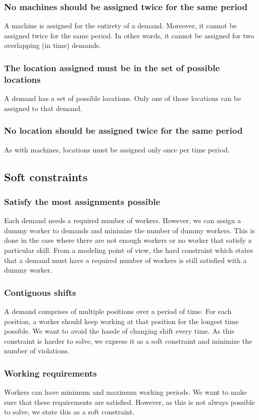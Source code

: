 \documentclass[../thesis.tex]{subfiles}
\begin{document}
\subsubsection{No machines should be assigned twice for the same period}

A machine is assigned for the entirety of a demand. Moreover, it cannot be assigned twice 
for the same period. In other words, it cannot be assigned for two overlapping (in time) demands.


\subsubsection{The location assigned must be in the set of possible locations}

A demand has a set of possible locations. Only one of those locations can be assigned 
to that demand.

\subsubsection{No location should be assigned twice for the same period}

As with machines, locations must be assigned only once per time period.


\subsection{Soft constraints}

\subsubsection{Satisfy the most assignments possible}

Each demand needs a required number of workers. However, we can assign a dummy worker to demands 
and minimize the number of dummy workers. This is done in the case where there are not enough workers
or no worker that satisfy a particular skill. From a modeling point of view, the hard constraint which states that 
a demand must have a required number of workers is still satisfied with a dummy worker.

\subsubsection{Contiguous shifts}

A demand comprises of multiple positions over a period of time. 
For each position, a worker should keep working at that position for the longest time possible. 
We want to avoid the hassle of changing shift every time. 
As this constraint is harder to solve, we express it as a soft constraint and minimize the number of 
violations.

\subsubsection{Working requirements}

Workers can have minimum and maximum working periods. We want to make sure 
that these requirements are satisfied. However, as this is not always possible to solve, we 
state this as a soft constraint.
\end{document}
